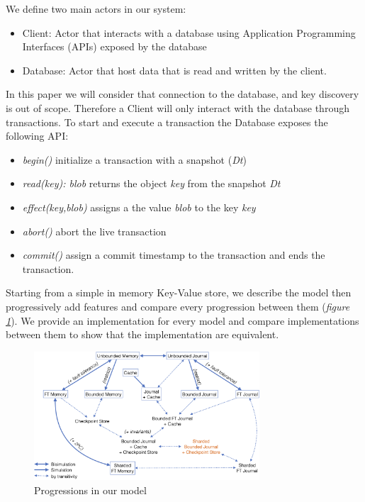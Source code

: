 \documentclass[systeme]{compas2022}
\begin{document}

We define two main actors in our system:
\begin{itemize}
  \item Client: Actor that interacts with a database using Application Programming Interfaces (APIs) exposed by the database
  \item Database: Actor that host data that is read and written by the client.
\end{itemize}


In this paper we will consider that connection to the database, and key discovery is out of scope.
Therefore a Client will only interact with the database through transactions.
To start and execute a transaction the Database exposes the following API:
\begin{itemize}
\item \emph{begin()} initialize a transaction with a snapshot (\emph{Dt})
\item \emph{read(key): blob} returns the object \emph{key} from the snapshot \emph{Dt}
\item \emph{effect(key,blob)} assigns a the value \emph{blob} to the key \emph{key}
\item \emph{abort()} abort the live transaction
\item \emph{commit()} assign a commit timestamp to the transaction and ends the transaction.
\end{itemize}

Starting from a simple in memory Key-Value store, we describe the model then progressively add features and compare every progression between them (\emph{figure \ref{fig:transitions}}).
We provide an implementation for every model and compare implementations between them to show that the implementation are equivalent.

\begin{figure}[tp]
  \centering
  \includegraphics[width=0.75\textwidth]{figures/transitions.png}
  \caption{Progressions in our model}
  \label{fig:transitions}
\end{figure}
\end{document}
